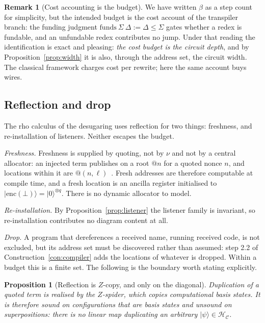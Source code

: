 \documentclass[11pt]{article}
\theoremstyle{definition}
\newtheorem{remark}[definition]{Remark}
\theoremstyle{plain}
\newtheorem{proposition}[definition]{Proposition}
\newcommand{\Cfg}{\mathcal{C}}
\newcommand{\Hs}{\mathcal{H}}
\newcommand{\Hc}{\Hs_{\Cfg}}
\newcommand{\ket}[1]{| #1 \rangle}
\begin{document}
\begin{remark}[Cost accounting is the budget]\label{rem:cost}
We have written $\beta$ as a step count for simplicity, but the intended budget is the cost
account of the transpiler branch: the funding judgment $\mathrm{funds}\ \Sigma\ \Delta := \Delta
\le \Sigma$ gates whether a redex is fundable, and an unfundable redex contributes no jump.
Under that reading the identification is exact and pleasing: \emph{the cost budget is the
circuit depth}, and by Proposition~\ref{prop:width} it is also, through the address set, the
circuit width. The classical framework charges cost per rewrite; here the same account
buys wires.
\end{remark}

\subsection{Reflection and drop}\label{ssec:reflection}

The rho calculus of the desugaring uses reflection for two things: freshness, and re-installation
of listeners. Neither escapes the budget.

\emph{Freshness.} Freshness is supplied by quoting, not by $\nu$ and not by a central allocator:
an injected term publishes on a root $@n$ for a quoted nonce $n$, and locations
within it are $@(n,\ell)$~\cite[Rem.~4.4]{knotted}. Fresh addresses are therefore
computable at compile time, and a fresh location is an ancilla register initialised to
$\ket{\mathrm{enc}(\bot)} = \ket{0}^{\otimes q}$. There is no dynamic allocator to model.

\emph{Re-installation.} By Proposition~\ref{prop:listener} the listener family is invariant, so
re-installation contributes no diagram content at all.

\emph{Drop.} A program that dereferences a received name, running received code, is not excluded,
but its address set must be discovered rather than assumed: step 2.2 of
Construction~\ref{con:compiler} adds the locations of whatever is dropped. Within a budget this
is a finite set. The following is the boundary worth stating explicitly.

\begin{proposition}[Reflection is $Z$-copy, and only on the diagonal]\label{prop:nocloning}
Duplication of a quoted term is realised by the $Z$-spider, which copies computational basis
states. It is therefore sound on configurations that are basis states and unsound on
superpositions: there is no linear map duplicating an arbitrary $\ket{\psi}\in\Hc$.
\end{proposition}
\end{document}
